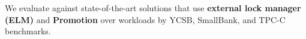 
We evaluate \sysname against state-of-the-art solutions that use \textbf{external lock manager (ELM)} \cite{DBLP:conf/icde/AlomariCFR08,DBLP:conf/aiccsa/AlomariF15} and \textbf{Promotion} \cite{DBLP:conf/icde/AlomariCFR08,DBLP:conf/icdt/VandevoortK0N22}  over workloads by YCSB, SmallBank, and TPC-C benchmarks.  %







